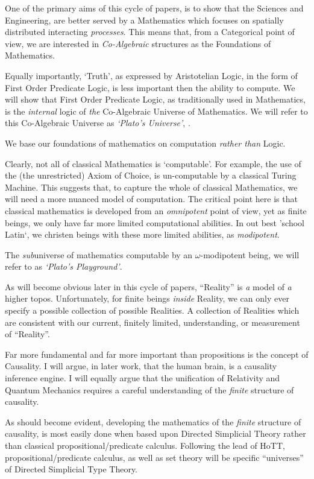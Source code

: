 \documentclass[a4paper,openany]{amsbook}
\begin{document}
One of the primary aims of this cycle of papers, is to show that the Sciences
and Engineering, are better served by a Mathematics which focuses on spatially
distributed interacting \emph{processes}. This means that, from a Categorical
point of view, we are interested in \emph{Co-Algebraic} structures as the
Foundations of Mathematics.

Equally importantly, `Truth', as expressed by Aristotelian Logic, in the form of
First Order Predicate Logic, is less important then the ability to compute. We
will show that First Order Predicate Logic, as traditionally used in
Mathematics, is the \emph{internal} logic of \emph{the} Co-Algebraic Universe of
Mathematics. We will refer to this Co-Algebraic Universe as \emph{`Plato's
Universe'}, \Universe.

We base our foundations of mathematics on computation \emph{rather than} Logic.

Clearly, not all of classical Mathematics is `computable'.  For example, the use
of the (the unrestricted) Axiom of Choice, is un-computable by a classical
Turing Machine. This suggests that, to capture the whole of classical
Mathematics, we will need a more nuanced model of computation. The critical
point here is that classical mathematics is developed from an \emph{omnipotent}
point of view, yet as finite beings, we only have far more limited computational
abilities. In out best 'school Latin`, we christen beings with these more
limited abilities, as \emph{modipotent}.

The \emph{sub}universe of mathematics computable by an $\omega$-modipotent
being, we will refer to as \emph{`Plato's Playground'}.


As will become obvious later in this cycle of papers, ``Reality'' is \emph{a}
model of \emph{a} higher topos.  Unfortunately, for finite beings \emph{inside}
Reality, we can only ever specify a possible collection of possible Realities. A
collection of Realities which are consistent with our current, finitely limited,
understanding, or measurement of ``Reality''.

Far more fundamental and far more important than propositions is the concept of
Causality.  I will argue, in later work, that the human brain, is a causality
inference engine. I will equally argue that the unification of Relativity and
Quantum Mechanics requires a careful understanding of the \emph{finite}
structure of causality.

As should become evident, developing the mathematics of the \emph{finite}
structure of causality, is most easily done when based upon Directed Simplicial
Theory rather than classical propositional/predicate calculus. Following the
lead of HoTT, propositional/predicate calculus, as well as set theory will be
specific ``universes'' of Directed Simplicial Type Theory.
\end{document}
